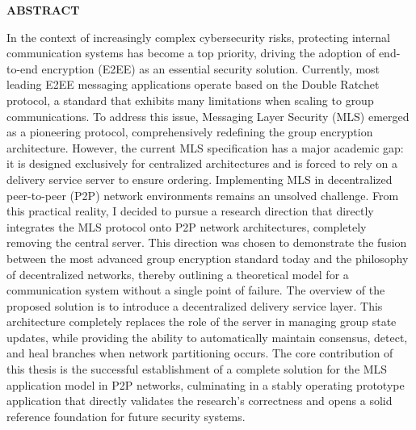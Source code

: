 \documentclass[../DoAn.tex]{subfiles}
\begin{document}
\begin{center}
    \Large{\textbf{ABSTRACT}}\\
\end{center}
\vspace{1cm}
In the context of increasingly complex cybersecurity risks, protecting internal communication systems has become a top priority, driving the adoption of end-to-end encryption (E2EE) as an essential security solution. Currently, most leading E2EE messaging applications operate based on the Double Ratchet protocol, a standard that exhibits many limitations when scaling to group communications. To address this issue, Messaging Layer Security (MLS) emerged as a pioneering protocol, comprehensively redefining the group encryption architecture. However, the current MLS specification has a major academic gap: it is designed exclusively for centralized architectures and is forced to rely on a delivery service server to ensure ordering. Implementing MLS in decentralized peer-to-peer (P2P) network environments remains an unsolved challenge. From this practical reality, I decided to pursue a research direction that directly integrates the MLS protocol onto P2P network architectures, completely removing the central server. This direction was chosen to demonstrate the fusion between the most advanced group encryption standard today and the philosophy of decentralized networks, thereby outlining a theoretical model for a communication system without a single point of failure. The overview of the proposed solution is to introduce a decentralized delivery service layer. This architecture completely replaces the role of the server in managing group state updates, while providing the ability to automatically maintain consensus, detect, and heal branches when network partitioning occurs. The core contribution of this thesis is the successful establishment of a complete solution for the MLS application model in P2P networks, culminating in a stably operating prototype application that directly validates the research's correctness and opens a solid reference foundation for future security systems.
\end{document}
